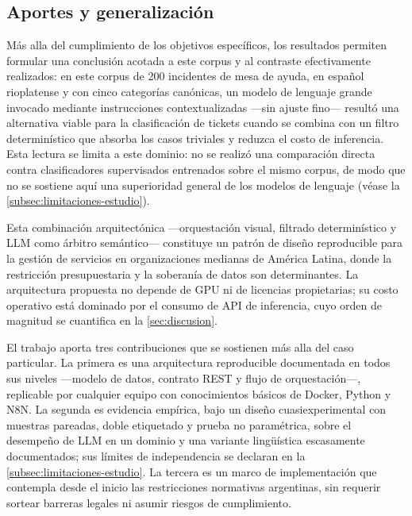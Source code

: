 \subsection{Aportes y generalización}\label{subsec:aportes-generalizacion}

Más alla del cumplimiento de los objetivos específicos, los resultados permiten formular una conclusión acotada a este corpus y al contraste efectivamente realizados: en este corpus de 200 incidentes de mesa de ayuda, en español rioplatense y con cinco categorías canónicas, un modelo de lenguaje grande invocado mediante instrucciones contextualizadas ---sin ajuste fino--- resultó una alternativa viable para la clasificación de tickets cuando se combina con un filtro determinístico que absorba los casos triviales y reduzca el costo de inferencia. Esta lectura se limita a este dominio: no se realizó una comparación directa contra clasificadores supervisados entrenados sobre el mismo corpus, de modo que no se sostiene aquí una superioridad general de los modelos de lenguaje (véase la \autoref{subsec:limitaciones-estudio}).

Esta combinación arquitectónica ---orquestación visual, filtrado determinístico y LLM como árbitro semántico--- constituye un patrón de diseño reproducible para la gestión de servicios en organizaciones medianas de América Latina, donde la restricción presupuestaria y la soberanía de datos son determinantes. La arquitectura propuesta no depende de GPU ni de licencias propietarias; su costo operativo está dominado por el consumo de API de inferencia, cuyo orden de magnitud se cuantifica en la \autoref{sec:discusion}.

El trabajo aporta tres contribuciones que se sostienen más alla del caso particular. La primera es una arquitectura reproducible documentada en todos sus niveles ---modelo de datos, contrato REST y flujo de orquestación---, replicable por cualquier equipo con conocimientos básicos de Docker, Python y N8N. La segunda es evidencia empírica, bajo un diseño cuasiexperimental con muestras pareadas, doble etiquetado y prueba no paramétrica, sobre el desempeño de LLM en un dominio y una variante lingüística escasamente documentados; sus límites de independencia se declaran en la \autoref{subsec:limitaciones-estudio}. La tercera es un marco de implementación que contempla desde el inicio las restricciones normativas argentinas, sin requerir sortear barreras legales ni asumir riesgos de cumplimiento.

\newpage
